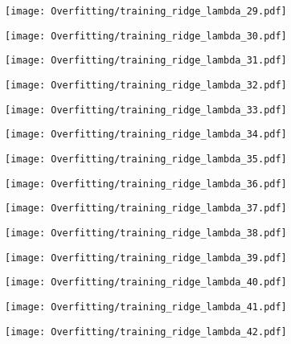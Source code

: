 \documentclass[xcolor=pdftex,dvipsnames,table]{beamer}
\begin{document}
\frame
{
	\begin{center}
		\texttt{[image: Overfitting/training\_ridge\_lambda\_29.pdf]}
	\end{center}
}
\frame
{
	\begin{center}
		\texttt{[image: Overfitting/training\_ridge\_lambda\_30.pdf]}
	\end{center}
}
\frame
{
	\begin{center}
		\texttt{[image: Overfitting/training\_ridge\_lambda\_31.pdf]}
	\end{center}
}
\frame
{
	\begin{center}
		\texttt{[image: Overfitting/training\_ridge\_lambda\_32.pdf]}
	\end{center}
}
\frame
{
	\begin{center}
		\texttt{[image: Overfitting/training\_ridge\_lambda\_33.pdf]}
	\end{center}
}
\frame
{
	\begin{center}
		\texttt{[image: Overfitting/training\_ridge\_lambda\_34.pdf]}
	\end{center}
}
\frame
{
	\begin{center}
		\texttt{[image: Overfitting/training\_ridge\_lambda\_35.pdf]}
	\end{center}
}
\frame
{
	\begin{center}
		\texttt{[image: Overfitting/training\_ridge\_lambda\_36.pdf]}
	\end{center}
}
\frame
{
	\begin{center}
		\texttt{[image: Overfitting/training\_ridge\_lambda\_37.pdf]}
	\end{center}
}
\frame
{
	\begin{center}
		\texttt{[image: Overfitting/training\_ridge\_lambda\_38.pdf]}
	\end{center}
}
\frame
{
	\begin{center}
		\texttt{[image: Overfitting/training\_ridge\_lambda\_39.pdf]}
	\end{center}
}
\frame
{
	\begin{center}
		\texttt{[image: Overfitting/training\_ridge\_lambda\_40.pdf]}
	\end{center}
}
\frame
{
	\begin{center}
		\texttt{[image: Overfitting/training\_ridge\_lambda\_41.pdf]}
	\end{center}
}
\frame
{
	\begin{center}
		\texttt{[image: Overfitting/training\_ridge\_lambda\_42.pdf]}
	\end{center}
}
\end{document}
